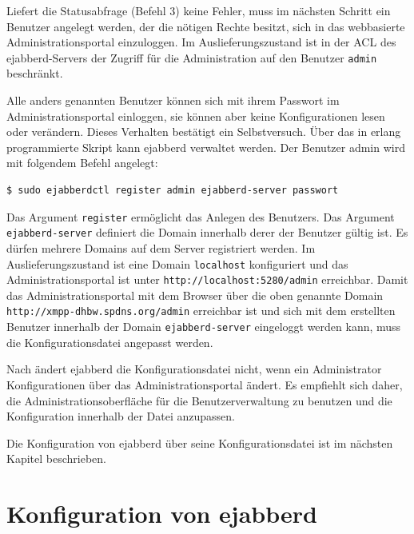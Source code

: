 \documentclass[a4paper,titlepage,halfparskip,12pt]{scrreprt}
\begin{document}
\begin{onehalfspacing}
Liefert die Statusabfrage (Befehl 3) keine Fehler, muss im nächsten Schritt ein Benutzer angelegt werden, der die nötigen Rechte besitzt, sich in das webbasierte Administrationsportal einzuloggen. Im Auslieferungszustand ist in der \ac{ACL} des ejabberd-Servers der Zugriff für die Administration auf den Benutzer \texttt{admin} beschränkt.\cite{ejabberdMGMT}

Alle anders genannten Benutzer können sich mit ihrem Passwort im Administrationsportal einloggen, sie können aber keine Konfigurationen lesen oder verändern. Dieses Verhalten bestätigt ein Selbstversuch. Über das in erlang programmierte Skript kann ejabberd verwaltet werden. Der Benutzer admin wird mit folgendem Befehl angelegt:\cite{ejabberdMGMT}

\bigskip

\begin{lstlisting}[language=bash, caption={Anlegen eines Benutzers für die Verwaltung von ejabberd},label={lst:AddAdminUserEjabberd}]
$ sudo ejabberdctl register admin ejabberd-server passwort
\end{lstlisting}

Das Argument \texttt{register} ermöglicht das Anlegen des Benutzers. Das Argument \texttt{ejabberd-server} definiert die Domain innerhalb derer der Benutzer gültig ist. Es dürfen mehrere Domains auf dem Server registriert werden. Im Auslieferungszustand ist eine Domain \texttt{localhost} konfiguriert und das Administrationsportal ist unter \texttt{http://localhost:5280/admin} erreichbar. Damit das Administrationsportal mit dem Browser über die oben genannte Domain \texttt{http://xmpp-dhbw.spdns.org/admin} erreichbar ist und sich mit dem erstellten Benutzer innerhalb der Domain \texttt{ejabberd-server} eingeloggt werden kann, muss die Konfigurationsdatei angepasst werden.\cite{ejabberdMGMT}

Nach \cite{ejabberdDoc} ändert ejabberd die Konfigurationsdatei nicht, wenn ein Administrator Konfigurationen über das Administrationsportal ändert. Es empfiehlt sich daher, die Administrationsoberfläche für die Benutzerverwaltung zu benutzen und die Konfiguration innerhalb der Datei anzupassen.

Die Konfiguration von ejabberd über seine Konfigurationsdatei ist im nächsten Kapitel beschrieben.


\section{Konfiguration von ejabberd}
\label{sec:Konfiguration}


\end{onehalfspacing}
\end{document}
